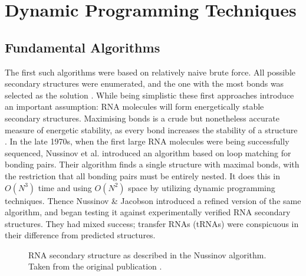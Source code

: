 \documentclass{cshonours}
\begin{document}
\section{Dynamic Programming Techniques}
\subsection{Fundamental Algorithms}
The first such algorithms were based on relatively naive brute force. All possible secondary structures were enumerated, and the one with
the most bonds was selected as the solution \cite{nussinov1978algorithms}. While being simplistic
these first approaches introduce an important assumption: RNA molecules will
form energetically stable secondary structures. Maximising bonds is a crude but
nonetheless accurate measure of energetic stability, as every bond increases the
stability of a structure \cite{nussinov1978algorithms}. In the late 1970s, when the first large RNA molecules
were being successfully sequenced, Nussinov et al. \cite{nussinov1978algorithms} introduced an algorithm
based on loop matching for bonding pairs. Their algorithm finds a
single structure with maximal bonds, with the restriction that all bonding pairs must be entirely nested. It does this in $O(N^3)$ time and using $O(N^2)$ space by utilizing dynamic programming techniques. Thence Nussinov \& Jacobson \cite{nussinov1980fast} introduced
a refined version of the same algorithm, and began testing it against experimentally verified RNA secondary structures. They had mixed success; transfer RNAs
(tRNAs) were conspicuous in their difference from predicted structures.

\begin{figure}
\begin{center}
\end{center}
\caption{RNA secondary structure as described in the Nussinov algorithm.
Taken from the original publication \cite{nussinov1980fast}.}
\label{nuss_rna}
\end{figure}
\end{document}
